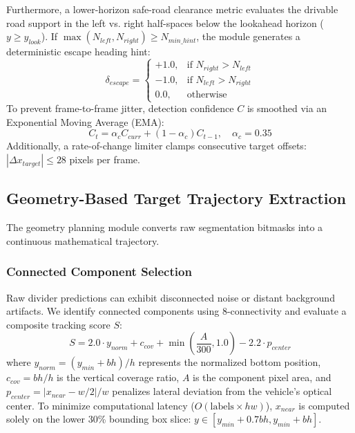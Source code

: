 \documentclass[conference]{IEEEtran}
\begin{document}
Furthermore, a lower-horizon safe-road clearance metric evaluates the drivable road support in the left vs. right half-spaces below the lookahead horizon ($y \ge y_{look}$). If $\max(N_{left}, N_{right}) \ge N_{min\_hint}$, the module generates a deterministic escape heading hint:
\begin{equation}
    \delta_{escape} = \begin{cases}
        +1.0, & \text{if } N_{right} > N_{left} \\
        -1.0, & \text{if } N_{left} > N_{right} \\
        0.0,  & \text{otherwise}
    \end{cases}
\end{equation}
To prevent frame-to-frame jitter, detection confidence $C$ is smoothed via an Exponential Moving Average (EMA):
\begin{equation}
    C_t = \alpha_c C_{curr} + (1 - \alpha_c) C_{t-1}, \quad \alpha_c = 0.35
\end{equation}
Additionally, a rate-of-change limiter clamps consecutive target offsets: $|\Delta x_{target}| \le 28$ pixels per frame.

\subsection{Geometry-Based Target Trajectory Extraction}
The geometry planning module converts raw segmentation bitmasks into a continuous mathematical trajectory.

\subsubsection{Connected Component Selection}
Raw divider predictions can exhibit disconnected noise or distant background artifacts. We identify connected components using 8-connectivity and evaluate a composite tracking score $S$:
\begin{equation}
    S = 2.0 \cdot y_{norm} + c_{cov} + \min\left(\frac{A}{300}, 1.0\right) - 2.2 \cdot p_{center}
\end{equation}
where $y_{norm} = (y_{min} + bh)/h$ represents the normalized bottom position, $c_{cov} = bh/h$ is the vertical coverage ratio, $A$ is the component pixel area, and $p_{center} = |x_{near} - w/2|/w$ penalizes lateral deviation from the vehicle's optical center. To minimize computational latency ($O(\text{labels} \times hw)$), $x_{near}$ is computed solely on the lower 30\% bounding box slice: $y \in [y_{min} + 0.7 bh, y_{min} + bh]$.
\end{document}
